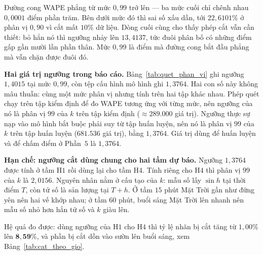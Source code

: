 \documentclass[12pt,a4paper]{article}
\begin{document}
Đường cong WAPE phẳng từ mức $0{,}99$ trở lên --- ba mức cuối chỉ chênh nhau $0{,}0001$ điểm
phần trăm. Bên dưới mức đó thì sai số xấu dần, tới $22{,}6101\%$ ở phân vị $0{,}90$ vì cắt mất
$10\%$ dữ liệu. Dòng cuối cùng cho thấy phép cắt vẫn cần thiết: bỏ hẳn nó thì ngưỡng nhảy
lên $13{,}4137$, tức đuôi phân bố có những điểm gấp gần mười lần phần thân. Mức $0{,}99$ là
điểm mà đường cong bắt đầu phẳng mà vẫn chặn được đuôi đó.

\textbf{Hai giá trị ngưỡng trong báo cáo.} Bảng~\ref{tab:quet_phan_vi} ghi ngưỡng $1{,}4015$
tại mức $0{,}99$, còn tệp cấu hình mô hình ghi $1{,}3764$. Hai con số này không mâu thuẫn: cùng
một mức phân vị nhưng tính trên hai tập khác nhau. Phép quét chạy trên tập kiểm định để đo WAPE
tương ứng với từng mức, nên ngưỡng của nó là phân vị $99$ của $k$ trên tập kiểm định
($\approx 289.000$ giá trị). Ngưỡng thực sự nạp vào mô hình bắt buộc phải suy từ tập huấn
luyện, nên nó là phân vị $99$ của $k$ trên tập huấn luyện ($681.536$ giá trị), bằng $1{,}3764$.
Giá trị dùng để huấn luyện và để chấm điểm ở Phần~$5$ là $1{,}3764$.

\textbf{Hạn chế: ngưỡng cắt dùng chung cho hai tầm dự báo.} Ngưỡng $1{,}3764$ được tính ở tầm
H$1$ rồi dùng lại cho tầm H$4$. Tính riêng cho H$4$ thì phân vị $99$ của $k$ là $2{,}0156$.
Nguyên nhân nằm ở cấu tạo của $k$: mẫu số lấy $\sin h$ tại thời điểm $T$, còn tử số là sản
lượng tại $T+h$. Ở tầm $15$ phút Mặt Trời gần như đứng yên nên hai vế khớp nhau; ở tầm $60$
phút, buổi sáng Mặt Trời lên nhanh nên mẫu số nhỏ hơn hẳn tử số và $k$ giàu lên.

Hệ quả đo được: dùng ngưỡng của H$1$ cho H$4$ thì tỷ lệ nhãn bị cắt tăng từ $1{,}00\%$ lên
$\mathbf{8{,}59\%}$, và phần bị cắt dồn vào sườn lên buổi sáng, xem
Bảng~\ref{tab:cat_theo_gio}.
\end{document}
